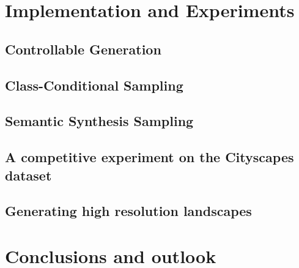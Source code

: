 \documentclass[a4paper, 12pt, oneside]{scrbook}
\begin{document}
\chapter{Implementation and Experiments}
\section{Controllable Generation} %
\section{Class-Conditional Sampling} %
\section{Semantic Synthesis Sampling} %
\section{A competitive experiment on the Cityscapes dataset} %
\section{Generating high resolution landscapes} %

\chapter{Conclusions and outlook} %
\appendix 

\end{document}
